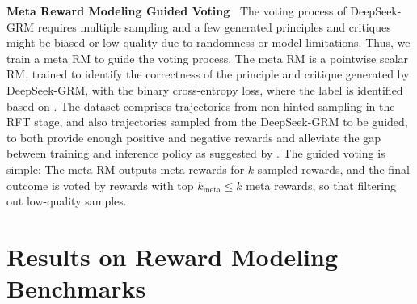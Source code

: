 \documentclass{article} %
\newcommand{\SGRMAll}{DeepSeek-GRM\xspace}
\begin{document}
\noindent\textbf{Meta Reward Modeling Guided Voting\ }
The voting process of \SGRMAll requires multiple sampling and a few generated principles and critiques might be biased or low-quality due to randomness or model limitations. Thus, we train a meta RM to guide the voting process. The meta RM is a pointwise scalar RM, trained to identify the correctness of the principle and critique generated by \SGRMAll, with the binary cross-entropy loss, where the label is identified based on . 
The dataset comprises trajectories from non-hinted sampling in the RFT stage, and also trajectories sampled from the \SGRMAll to be guided, to both provide enough positive and negative rewards and alleviate the gap between training and inference policy as suggested by \citet{chow2025inferenceaware}. The guided voting is simple: The meta RM outputs meta rewards for $k$ sampled rewards, and the final outcome is voted by rewards with top $k_{\mathrm{meta}} \leq k$ meta rewards, so that filtering out low-quality samples. 


\vspace{-0.5em}
\section{Results on Reward Modeling Benchmarks}
\end{document}
